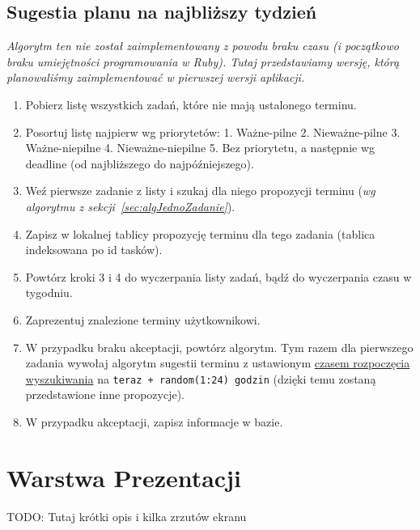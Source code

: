 \documentclass[pdflatex,11pt]{aghdpl}
\begin{document}
\subsection{Sugestia planu na najbliższy tydzień}
\label{sec:algPlanTygodniowy}

\textit{Algorytm ten nie został zaimplementowany z powodu braku czasu (i początkowo braku umiejętności programowania w Ruby). Tutaj przedstawiamy wersję, którą planowaliśmy zaimplementować w pierwszej wersji aplikacji.}

\begin{enumerate}
\item Pobierz listę wszystkich zadań, które nie mają ustalonego terminu.
\item Posortuj listę najpierw wg priorytetów: 1. Ważne-pilne 2. Nieważne-pilne 3. Ważne-niepilne 4. Nieważne-niepilne 5. Bez priorytetu, a następnie wg deadline (od najbliższego do najpóźniejszego).
\item Weź pierwsze zadanie z listy i szukaj dla niego propozycji terminu (\textit{wg algorytmu z sekcji~\ref{sec:algJednoZadanie}}).
\item Zapisz w lokalnej tablicy propozycję terminu dla tego zadania (tablica indeksowana po id tasków).
\item Powtórz kroki 3 i 4 do wyczerpania listy zadań, bądź do wyczerpania czasu w tygodniu.
\item Zaprezentuj znalezione terminy użytkownikowi.
\item W przypadku braku akceptacji, powtórz algorytm. Tym razem dla pierwszego zadania wywołaj algorytm sugestii terminu z ustawionym \underline{czasem rozpoczęcia wyszukiwania} na \texttt{teraz + random(1:24) godzin} (dzięki temu zostaną przedstawione inne propozycje).
\item W przypadku akceptacji, zapisz informacje w bazie.
\end{enumerate}


\section{Warstwa Prezentacji}

TODO: Tutaj krótki opis i kilka zrzutów ekranu


\end{document}
